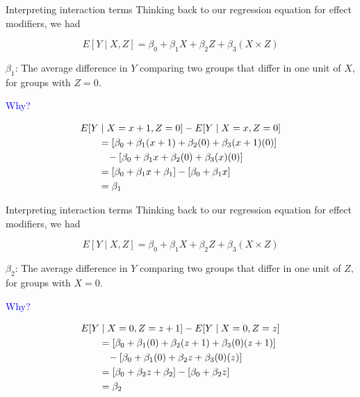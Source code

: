 \documentclass[10pt,t]{beamer}
\begin{document}
\begin{frame}{Interpreting interaction terms}
Thinking back to our regression equation for effect modifiers, we had

$$
E[Y \mid X, Z] = \beta_0 + \beta_1 X + \beta_2 Z + \beta_3 (X \times Z)
$$

$\beta_1$: The average difference in $Y$ comparing two groups that differ in one unit of $X$, for groups with $Z = 0$.

\vspace{0.3cm}

\textcolor{blue}{Why?} \pause 

\begin{align*}
E[Y & \mid X = x + 1, Z = 0] - E[Y  \mid X = x, Z = 0] \\
& = [\beta_0 + \beta_1 (x +1) + \beta_2 (0) + \beta_3 (x + 1)(0)] \\
& \hspace{0.3cm}- [\beta_0 + \beta_1 x + \beta_2 (0) + \beta_3 (x)(0)] \\
& = [\beta_0 + \beta_1 x + \beta_1] - [\beta_0 + \beta_1 x] \\
& = \beta_1
\end{align*}

\end{frame}

\begin{frame}{Interpreting interaction terms}
Thinking back to our regression equation for effect modifiers, we had

$$
E[Y \mid X, Z] = \beta_0 + \beta_1 X + \beta_2 Z + \beta_3 (X \times Z)
$$

$\beta_2$: The average difference in $Y$ comparing two groups that differ in one unit of $Z$, for groups with $X= 0$.

\vspace{0.3cm}

\textcolor{blue}{Why?} \pause 

\begin{align*}
E[Y & \mid X = 0, Z = z + 1] - E[Y  \mid X = 0, Z = z] \\
& = [\beta_0 + \beta_1 (0) + \beta_2 (z + 1) + \beta_3 (0)(z + 1)] \\
& \hspace{0.3cm}- [\beta_0 + \beta_1 (0) + \beta_2 z + \beta_3 (0)(z)] \\
& = [\beta_0 + \beta_2 z + \beta_2] - [\beta_0 + \beta_2 z] \\
& = \beta_2
\end{align*}
\end{frame}
\end{document}
